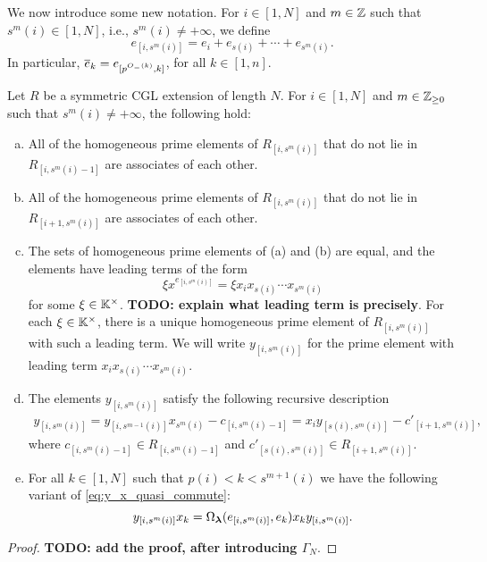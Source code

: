 We now introduce some new notation. For $i \in [1, N]$ and $m \in \mathbb{Z}$ such that
$s^m(i)\in [1, N]$, i.e., $s^m(i) \neq + \infty$, we define
\begin{equation*}
	e_{[i, s^m(i)]} = e_i + e_{s(i)} + \cdots + e_{s^m(i)}.
\end{equation*}
In particular, $\overline{e}_k = e_{[p^{O_{-}(k)}, k]}$, for all $k \in [1, n]$.
\begin{theorem}\label{thm:y_square_brackets}
	Let $R$ be a symmetric CGL extension of length $N$. For $i\in [1, N]$ and $m \in \mathbb{Z}_{\geq 0}$ such that $s^m(i) \neq + \infty$, the following hold:
	\begin{enumerate}[(a)]
		\item All of the homogeneous prime elements of $R_{[i, s^m(i)]}$ that do not lie in $R_{[i,
							      s^m(i)-1]}$ are associates of each other.
		\item All of the homogeneous prime elements of $R_{[i, s^m(i)]}$ that do not lie in $R_{[i+1,
							      s^m(i)]}$ are associates of each other.
		\item The sets of homogeneous prime elements of \textrm{(a)} and \textrm{(b)} are equal, and
		      the elements have leading terms of the form
		      \begin{equation*}
			      \xi x^{e_{[i, s^m(i)]}} = \xi x_i x_{s(i)}\cdots x_{s^m(i)}
		      \end{equation*}
		      for some $\xi \in \mathbb{K}^\times$. \textbf{TODO: explain what leading term is precisely}.
		      For each $\xi \in \mathbb{K}^\times$, there is a unique homogeneous prime element of $R_{[i,
							      s^m(i)]}$ with such a leading term. We will write $y_{[i, s^m(i)]}$ for the prime
		      element with leading term $x_i x_{s(i)}\cdots x_{s^m(i)}$.
		\item The elements $y_{[i, s^m(i)]}$ satisfy the following recursive description
		      \begin{align*}
			      y_{[i, s^m(i)]} = y_{[i, s^{m-1}(i)]}x_{s^m (i)} - c_{[i, s^m(i) -1]} = x_i y_{[s(i), s^m(i)]} - c'_{[i+1, s^m(i)]},
		      \end{align*}
		      where $c_{[i, s^m(i) -1]} \in R_{[i, s^m(i) - 1]}$ and $c'_{[s(i), s^m(i)]} \in
			      R_{[i+1, s^m(i)]}$.
		\item For all $k \in [1, N]$ such that $p(i) < k < s^{m+1}(i)$ we have the following variant
		      of \cref{eq:y_x_quasi_commute}:
		      \begin{equation*}
			      y_{[i, s^m(i)]}x_k = \Omega_{\boldsymbol{\lambda}}(e_{[i, s^m(i)]}, e_k)x_k y_{[i, s^m(i)]}.
		      \end{equation*}
	\end{enumerate}
\end{theorem}
\begin{proof}
	\textbf{TODO: add the proof, after introducing $\Gamma_N$}.
\end{proof}

